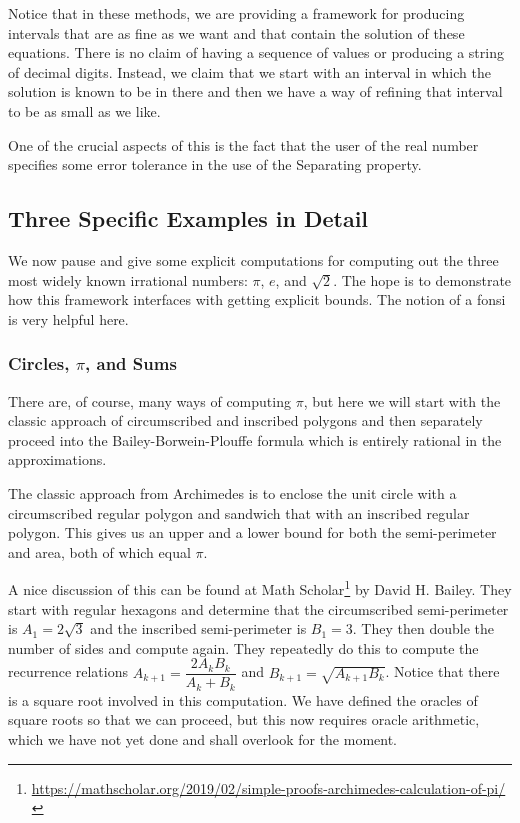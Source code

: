 \documentclass[12pt]{article}
\begin{document}
Notice that in these methods, we are providing a framework for producing intervals that are as fine as we want and that contain the solution of these equations. There is no claim of having a sequence of values or producing a string of decimal digits. Instead, we claim that we start with an interval in which the solution is known to be in there and then we have a way of refining that interval to be as small as we like. 

One of the crucial aspects of this is the fact that the user of the real number specifies some error tolerance in the use of the Separating property. 

\subsection{Three Specific Examples in Detail}


We now pause and give some explicit computations for computing out the three most widely known irrational numbers: $\pi$, $e$, and $\sqrt{2}$. The hope is to demonstrate how this framework interfaces with getting explicit bounds. The notion of a fonsi is very helpful here. 

\subsubsection{Circles, \texorpdfstring{$\pi$}{pi}, and Sums}

There are, of course, many ways of computing $\pi$, but here we will start with the classic approach of circumscribed and inscribed polygons and then separately proceed into the Bailey-Borwein-Plouffe formula which is entirely rational in the approximations. 

The classic approach from Archimedes is to enclose the unit circle with a circumscribed regular polygon and sandwich that with an inscribed regular polygon. This gives us an upper and a lower bound for both the semi-perimeter and area, both of which equal $\pi$. 

A nice discussion of this can be found at Math Scholar\footnote{\url{https://mathscholar.org/2019/02/simple-proofs-archimedes-calculation-of-pi/}} by David H. Bailey. They start with regular hexagons and determine that the circumscribed semi-perimeter is $A_1 = 2 \sqrt{3}$ and the inscribed semi-perimeter is $B_1 = 3$. They then double the number of sides and compute again. They repeatedly do this to compute the recurrence relations $A_{k+1} = \dfrac{2A_k B_k}{A_k + B_k}$ and $B_{k+1} = \sqrt{A_{k+1}B_k}$. Notice that there is a square root involved in this computation. We have defined the oracles of square roots so that we can proceed, but this now requires oracle arithmetic, which we have not yet done and shall overlook for the moment.  
\end{document}
